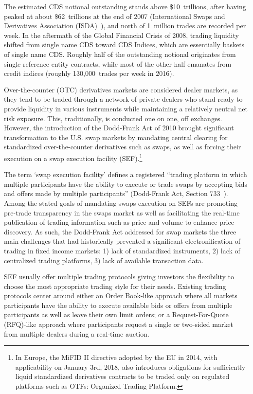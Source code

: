 \begin{enumerate}
The estimated CDS notional outstanding stands above \$10~trillions, after having peaked at about \$62~trillions at the end of 2007 (International Swaps and Derivatives Association (ISDA)~\cite{ISDA}), and north of 1~million trades are recorded per week. In the aftermath of the Global Financial Crisis of 2008, trading liquidity shifted from single name CDS toward CDS Indices, which are essentially baskets of single name CDS. Roughly half of the outstanding notional originates from single reference entity contracts, while most of the other half emanates from credit indices (roughly 130,000~trades per week in 2016).


Over-the-counter (OTC) derivatives markets are considered dealer markets, as they tend to be traded through a network of private dealers who stand ready to provide liquidity in various instruments while maintaining a relatively neutral net risk exposure. This, traditionally, is conducted one on one, off exchanges. However, the introduction of the Dodd-Frank Act of 2010 brought significant transformation to the U.S. swap markets by mandating central clearing for standardized over-the-counter derivatives such as swaps, as well as forcing their execution on a swap execution facility (SEF).\footnote{In Europe, the MiFID II directive adopted by the EU in 2014, with applicability on January 3rd, 2018, also introduces obligations for sufficiently liquid standardized derivatives contracts to be traded only on regulated platforms such as OTFs: Organized Trading Platform.}


The term `swap execution facility' defines a registered ``trading platform in which multiple participants have the ability to execute or trade swaps by accepting bids and offers made by multiple participants'' (Dodd-Frank Act, Section 733~\cite{DoddFrank}). Among the stated goals of mandating swaps execution on SEFs are promoting pre-trade transparency in the swaps market as well as facilitating the real-time publication of trading information such as price and volume to enhance price discovery. As such, the Dodd-Frank Act addressed for swap markets the three main challenges that had historically prevented a significant electronification of trading in fixed income markets: 1) lack of standardized instruments, 2) lack of centralized trading platforms, 3) lack of available transaction data.


SEF usually offer multiple trading protocols giving investors the flexibility to choose the most appropriate trading style for their needs. Existing trading protocols center around either an Order Book-like approach where all markets participants have the ability to execute available bids or offers from multiple participants as well as leave their own limit orders; or a Request-For-Quote (RFQ)-like approach where participants request a single or two-sided market from multiple dealers during a real-time auction.



\end{enumerate}
